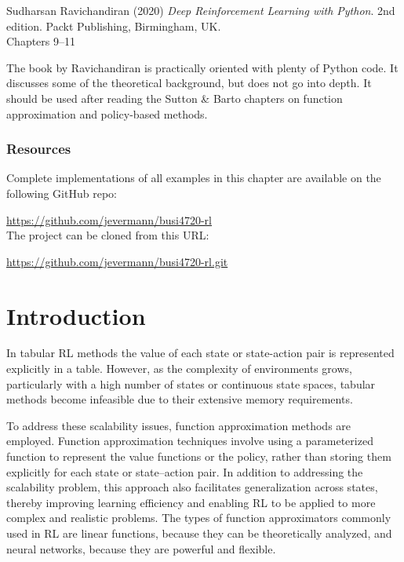 \begin{tcolorbox}[colback=alert]
Sudharsan Ravichandiran (2020) \emph{Deep Reinforcement Learning with Python}. 2nd edition. Packt Publishing, Birmingham, UK. \\
\vspace{0.5\baselineskip}
Chapters 9--11
\end{tcolorbox}

The book by Ravichandiran is practically oriented with plenty of Python code. It discusses some of the theoretical background, but does not go into depth. It should be used after reading the Sutton \& Barto chapters on function approximation and policy-based methods.


\begin{tcolorbox}[colback=alert]
\subsubsection*{Resources}
Complete implementations of all examples in this chapter are available on the following GitHub repo:

\url{https://github.com/jevermann/busi4720-rl} \\

The project can be cloned from this URL:

\url{https://github.com/jevermann/busi4720-rl.git}
\end{tcolorbox}


\section{Introduction}

In tabular RL methods the value of each state or state-action pair is represented explicitly in a table. However, as the complexity of environments grows, particularly with a high number of states or continuous state spaces, tabular methods become infeasible due to their extensive memory requirements. 

To address these scalability issues, function approximation methods are employed. Function approximation techniques involve using a parameterized function to represent the value functions or the policy, rather than storing them explicitly for each state or state--action pair. In addition to addressing the scalability problem, this approach also facilitates generalization across states, thereby improving learning efficiency and enabling RL to be applied to more complex and realistic problems. The types of function approximators commonly used in RL are linear functions, because they can be theoretically analyzed, and neural networks, because they are powerful and flexible. 

